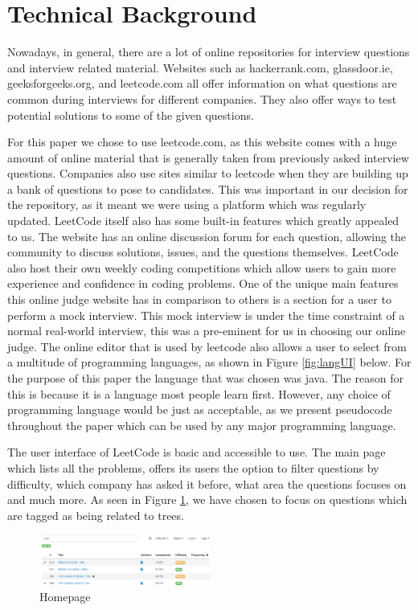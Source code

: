 \documentclass[10pt,twocolumn]{IEEEtran}
\begin{document}
\section{Technical Background}
\par Nowadays, in general, there are a lot of online repositories for interview questions and interview related material. Websites such as hackerrank.com, glassdoor.ie, geeksforgeeks.org, and leetcode.com all offer information on what questions are common during interviews for different companies. They also offer ways to test potential solutions to some of the given questions. 
\par For this paper we chose to use leetcode.com\cite{leet1}, as this website comes with a huge amount of online material that is generally taken from previously asked interview questions. Companies also use sites similar to leetcode when they are building up a bank of questions to pose to candidates. This was important in our decision for the repository, as it meant we were using a platform which was regularly updated. LeetCode itself also has some built-in features which greatly appealed to us. The website has an online discussion forum for each question, allowing the community to discuss solutions, issues, and the questions themselves. LeetCode also host their own weekly coding competitions which allow users to gain more experience and confidence in coding problems. One of the unique main features this online judge website has in comparison to others is a section for a user to perform a mock interview. This mock interview is under the time constraint of a normal real-world interview, this was a pre-eminent for us in choosing our online judge. The online editor that is used by leetcode also allows a user to select from a multitude of programming languages, as shown in Figure \ref{fig:langUI} below. For the purpose of this paper the language that was chosen was java. The reason for this is because it is a language most people learn first. However, any choice of programming language would be just as acceptable, as we present pseudocode throughout the paper which can be used by any major programming language.  
\par The user interface of LeetCode is basic and accessible to use. The main page which lists all the problems, offers its users the option to filter questions by difficulty, which company has asked it before, what area the questions focuses on and much more. As seen in Figure \ref{fig:homepage}, we have chosen to focus on questions which are tagged as being related to trees. 
\begin{figure}[h]
\includegraphics[width=0.5\textwidth]{homepageUI.png}
\caption{Homepage}
\label{fig:homepage}
\end{figure}
\end{document}
